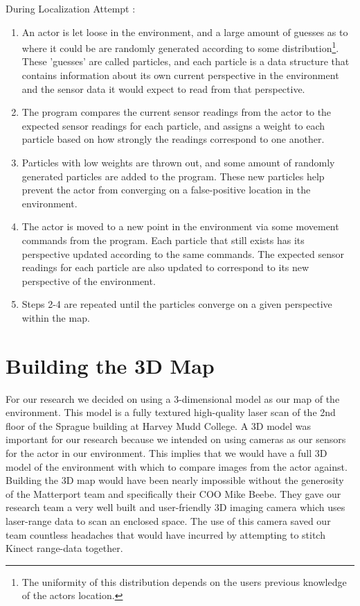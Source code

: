 \documentclass[a4paper,11pt]{article}
\begin{document}
  During Localization Attempt :
  
  \begin{enumerate}
  \item An actor is let loose in the environment, and a large amount of guesses as to where it could be are randomly generated according to some distribution\footnote{The uniformity of this distribution depends on the users previous knowledge of the actors location.}. These 'guesses' are called particles, and each particle is a data structure that contains information about its own current perspective in the environment and the sensor data it would expect to read from that perspective.
  \item The program compares the current sensor readings from the actor to the expected sensor readings for each particle, and assigns a weight to each particle based on how strongly the readings correspond to one another.
  \item Particles with low weights are thrown out, and some amount of randomly generated particles are added to the program. These new particles help prevent the actor from converging on a false-positive location in the environment.
  \item The actor is moved to a new point in the environment via some movement commands from the program. Each particle that still exists has its perspective updated according to the same commands. The expected sensor readings for each particle are also updated to correspond to its new perspective of the environment.
  \item Steps 2-4 are repeated until the particles converge on a given perspective within the map. 
  \end{enumerate} 
  
  \newpage




  \section{Building the 3D Map}
  For our research we decided on using a 3-dimensional model as our map of the environment. This model is a fully textured high-quality laser scan of the 2nd floor of the Sprague building at Harvey Mudd College. A 3D model was important for our research because we intended on using cameras as our sensors for the actor in our environment. This implies that we would have a full 3D model of the environment with which to compare  images from the actor against.  Building the 3D map would have been nearly impossible without the generosity of the Matterport team and specifically their COO Mike Beebe. They gave our research team a very well built and user-friendly 3D imaging camera which uses laser-range data to scan an enclosed space. The use of this camera saved our team countless headaches that would have incurred by attempting to stitch Kinect range-data together.
  
\end{document}
